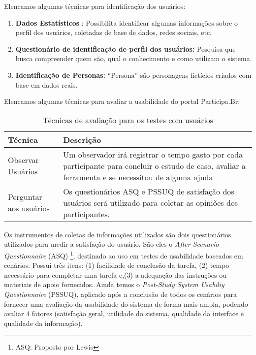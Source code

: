Elencamos algumas técnicas para identificação dos usuários:

\begin{enumerate}
\item \textbf{Dados Estatísticos} : Possibilita identificar algumas informações sobre o perfil dos usuários, coletadas de base de dados, redes sociais, etc.

\item \textbf{Questionário de identificação de perfil dos usuários:} Pesquisa que busca compreender quem são, qual o conhecimento e como utilizam o sistema. 

\item \textbf{Identificação de Personas:} “Persona” são personagens fictícios criados com base em dados reais.  
\end{enumerate}

Elencamos algumas técnicas para avaliar a usabilidade do portal Participa.Br:

\begin{table}[h]
\begin{tabular}{|l| p{5cm} |}
\hline
Técnica & Descrição \\ \hline
Observar Usuários & Um observador irá registrar o tempo 
gasto por cada participante para concluir o estudo de caso, 
avaliar a ferramenta e se necessitou de alguma ajuda    \\ \hline
Perguntar aos usuários & Os questionários ASQ e PSSUQ 
de satisfação dos usuários será utilizado 
para coletar as opiniões dos participantes.\\ \hline
\end{tabular}
\caption{Técnicas de avaliação para os testes com usuários}
\label{tabela-tecnicas}
\end{table}

Os instrumentos de coletas de informações utilizados são dois questionários utilizados para medir a satisfação do usuário.
%
São eles o \textit{After-Scenario Questionnaire} (ASQ) \footnote{ASQ: Proposto por Lewis}, destinado ao uso em testes de usabilidade baseados em cenários. Possui três itens: (1) facilidade de conclusão da tarefa, (2) tempo necessário para completar uma tarefa e,(3) a adequação das instruções ou materiais de apoio fornecidos. Ainda temos o \textit{Post-Study System Usabiliy Questionnaire} (PSSUQ), aplicado após a conclusão de todos os cenários para fornecer uma avaliação  da usabilidade do sistema de forma mais ampla, podendo avaliar 4 fatores (satisfação geral, utilidade do sistema, qualidade da interface e qualidade da informação). 

